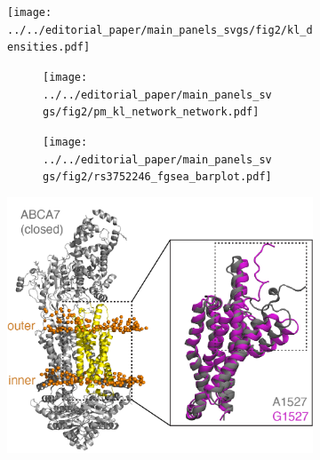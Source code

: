 \documentclass[12pt]{article}
\begin{document}
\begin{figure}[H]
    \begin{subfigure}[t]{0.6\textwidth}
        \caption{}
        \texttt{[image: ../../editorial\_paper/main\_panels\_svgs/fig2/kl\_densities.pdf]}        
    \end{subfigure}
    \begin{subfigure}[t]{0.2\textwidth}
        \begin{subfigure}[t]{\textwidth}
            \caption{}
            \texttt{[image: ../../editorial\_paper/main\_panels\_svgs/fig2/pm\_kl\_network\_network.pdf]}        
        \end{subfigure}
        \begin{subfigure}[t]{\textwidth}
            \caption{}
            \texttt{[image: ../../editorial\_paper/main\_panels\_svgs/fig2/rs3752246\_fgsea\_barplot.pdf]}        
        \end{subfigure}
    \end{subfigure}
\begin{subfigure}[t]{0.35\textwidth}
    \caption{}
    \includegraphics[width=\textwidth]{../../paper/main_plots/abca7_structure_with_inset.png}        
\end{subfigure}
\begin{subfigure}[t]{0.165\textwidth}
    \caption{}

\end{subfigure}
\end{figure}
\end{document}

